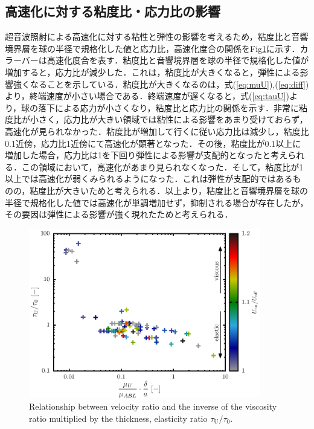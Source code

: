 \subsection{高速化に対する粘度比・応力比の影響}
超音波照射による高速化に対する粘性と弾性の影響を考えるため，粘度比と音響境界層を球の半径で規格化した値と応力比，高速化度合の関係をFig\ref{fig:elastcityColor}に示す．カラーバーは高速化度合を表す．粘度比と音響境界層を球の半径で規格化した値が増加すると，応力比が減少した．これは，粘度比が大きくなると，弾性による影響強くなることを示している．粘度比が大きくなるのは，式(\ref{eq:muU}),(\ref{eq:diff})より，終端速度が小さい場合である．終端速度が遅くなると，式(\ref{eq:tauU})より，球の落下による応力が小さくなり，粘度比と応力比の関係を示す．非常に粘度比が小さく，応力比が大きい領域では粘性による影響をあまり受けておらず，高速化が見られなかった．粘度比が増加して行くに従い応力比は減少し，粘度比0.1近傍，応力比1近傍にて高速化が顕著となった．その後，粘度比が0.1以上に増加した場合，応力比は1を下回り弾性による影響が支配的となったと考えられる．この領域において，高速化があまり見られなくなった．そして，粘度比が1以上では高速化が弱くみられるようになった．これは弾性が支配的ではあるものの，粘度比が大きいためと考えられる．以上より，粘度比と音響境界層を球の半径で規格化した値では高速化が単調増加せず，抑制される場合が存在したが，その要因は弾性による影響が強く現れたためと考えられる．

\begin{figure}[H]
    \centering
    \includegraphics[width=0.9\textwidth]{5-Results/elastcity_color.eps}
    \caption{Relationship between velocity ratio and the inverse of the viscosity ratio multiplied by the thickness, elasticity ratio $\tau_\text{U}/\tau_\text{0}$.}
    \label{fig:elastcityColor}
\end{figure}

